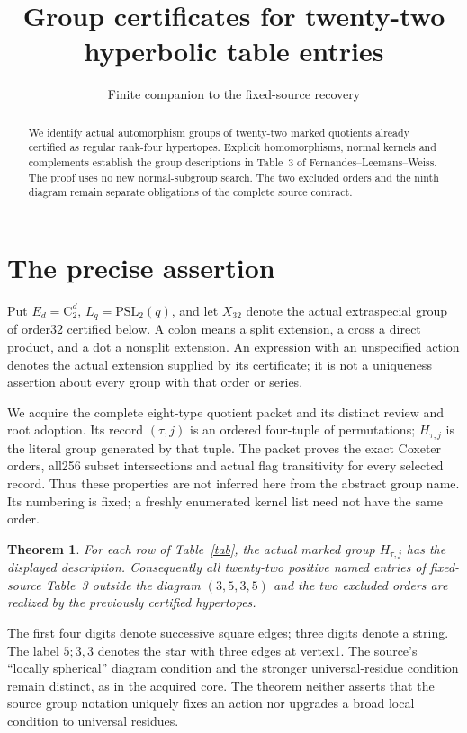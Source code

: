 \documentclass[11pt]{article}
\title{Group certificates for twenty-two hyperbolic table entries}
\author{Finite companion to the fixed-source recovery}\date{}
\newtheorem{theorem}{Theorem}\newtheorem{lemma}{Lemma}
\newcommand{\C}{\mathrm C}\newcommand{\A}{\mathrm A}\newcommand{\Sym}{\mathrm S}\newcommand{\PSL}{\mathrm{PSL}}
\begin{document}
\maketitle
\begin{abstract}
We identify actual automorphism groups of twenty-two marked quotients already
certified as regular rank-four hypertopes. Explicit homomorphisms, normal
kernels and complements establish the group descriptions in Table~3 of
Fernandes--Leemans--Weiss. The proof uses no new normal-subgroup search.
The two excluded orders and the ninth diagram remain separate obligations
of the complete source contract.
\end{abstract}
\section{The precise assertion}
Put $E_d=\C_2^d$, $L_q=\PSL_2(q)$, and let $X_{32}$ denote the actual
extraspecial group of order32 certified below. A colon means a split
extension, a cross a direct product, and a dot a nonsplit extension.
An expression with an unspecified action denotes the actual extension
supplied by its certificate; it is not a uniqueness assertion about every
group with that order or series.

We acquire the complete eight-type quotient packet and its distinct review
and root adoption. Its record $(\tau,j)$ is an ordered four-tuple of
permutations; $H_{\tau,j}$ is the literal group generated by that tuple.
The packet proves the exact Coxeter orders, all256 subset intersections and
actual flag transitivity for every selected record. Thus these properties
are not inferred here from the abstract group name. Its numbering is fixed;
a freshly enumerated kernel list need not have the same order.

\begin{theorem}
For each row of Table~\ref{tab}, the actual marked group $H_{\tau,j}$ has the
displayed description. Consequently all twenty-two positive named entries
of fixed-source Table~3 outside the diagram $(3,5,3,5)$ and the two excluded
orders are realized by the previously certified hypertopes.
\end{theorem}
The first four digits denote successive square edges; three digits denote
a string. The label $5;3,3$ denotes the star with three edges at vertex1.
The source's ``locally spherical'' diagram condition and the stronger
universal-residue condition remain distinct, as in the acquired core.
The theorem neither asserts that the source group notation uniquely fixes
an action nor upgrades a broad local condition to universal residues.
\end{document}
